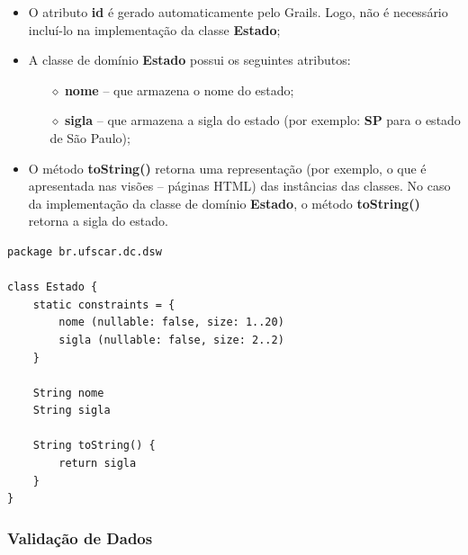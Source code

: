 \begin{itemize}

\item O  atributo {\bf  id} é  gerado automaticamente pelo  Grails. Logo,  não é
  necessário incluí-lo na implementação da classe {\bf Estado}; 

\vspace{0.2cm}

\item A classe de domínio {\bf Estado} possui os seguintes atributos:

\vspace{0.2cm}

\begin{itemize}

\item[$\diamond$] {\bf nome} -- que armazena o nome do estado;

\vspace{0.2cm}

\item[$\diamond$] {\bf  sigla} -- que armazena  a sigla do  estado (por exemplo:
  {\bf SP} para o estado de São Paulo); 

\end{itemize}

\vspace{0.5cm}

\item O método {\bf toString()} retorna  uma representação (por exemplo, o que é
  apresentada nas visões – páginas HTML) das instâncias das classes.  No caso da
  implementação da  classe de  domínio {\bf Estado},  o método  {\bf toString()}
  retorna a sigla do estado.
 
\end{itemize}

\newpage

\begin{lstlisting}[caption=Classe  de  domínio   {\bf  Estado},  frame  =  trBL,
    float=htbp, label=codEstado] 
package br.ufscar.dc.dsw

class Estado {
    static constraints = {
        nome (nullable: false, size: 1..20)
        sigla (nullable: false, size: 2..2)
    }
    
    String nome
    String sigla
    
    String toString() {
        return sigla
    }
}
\end{lstlisting}

\subsubsection{Validação de Dados}\label{validacao}

